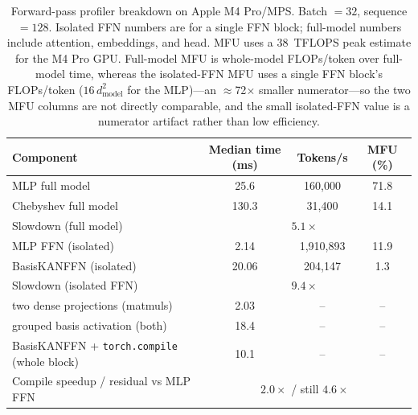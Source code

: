 \documentclass{article}
\begin{document}
\begin{table}[t]
\centering
\caption{Forward-pass profiler breakdown on Apple M4 Pro/MPS. Batch \(=32\), sequence \(=128\). Isolated FFN numbers are for a single FFN block; full-model numbers include attention, embeddings, and head. MFU uses a \(38\)~TFLOPS peak estimate for the M4 Pro GPU. Full-model MFU is whole-model FLOPs/token over full-model time, whereas the isolated-FFN MFU uses a single FFN block's FLOPs/token (\(16\,d_{\mathrm{model}}^2\) for the MLP)---an \(\approx\)72\(\times\) smaller numerator---so the two MFU columns are not directly comparable, and the small isolated-FFN value is a numerator artifact rather than low efficiency.}
\label{tab:profiler}
\begin{tabular}{@{}lccc@{}}
\toprule
Component & Median time (ms) & Tokens/s & MFU (\%) \\
\midrule
MLP full model & 25.6 & 160,000 & 71.8 \\
Chebyshev full model & 130.3 & 31,400 & 14.1 \\
\quad Slowdown (full model) & \multicolumn{3}{c}{\(5.1\times\)} \\
\midrule
MLP FFN (isolated) & 2.14 & 1,910,893 & 11.9 \\
BasisKANFFN (isolated) & 20.06 & 204,147 & 1.3 \\
\quad Slowdown (isolated FFN) & \multicolumn{3}{c}{\(9.4\times\)} \\
\midrule
\quad two dense projections (matmuls) & 2.03 & -- & -- \\
\quad grouped basis activation (both) & 18.4 & -- & -- \\
\midrule
BasisKANFFN + \texttt{torch.compile} (whole block) & 10.1 & -- & -- \\
\quad Compile speedup / residual vs MLP FFN & \multicolumn{3}{c}{\(2.0\times\) / still \(4.6\times\)} \\
\bottomrule
\end{tabular}
\end{table}
\end{document}

